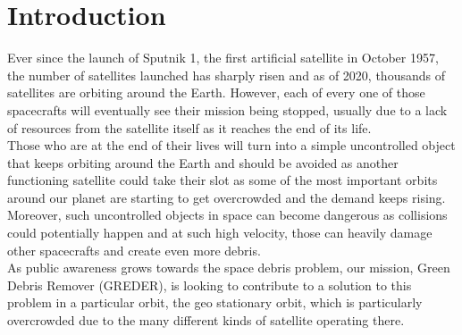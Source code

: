 \chapter*{Introduction}
\qquad Ever since the launch of Sputnik 1, the first artificial satellite in October 1957, the number of satellites launched has sharply risen and as of 2020, thousands of satellites are orbiting around the Earth. However, each of every one of those spacecrafts will eventually see their mission being stopped, usually due to a lack of resources from the satellite itself as it reaches the end of its life. \\

Those who are at the end of their lives will turn into a simple uncontrolled object that keeps orbiting around the Earth and should be avoided as another functioning satellite could take their slot as some of the most important orbits around our planet are starting to get overcrowded and the demand keeps rising.\\

Moreover, such uncontrolled objects in space can become dangerous as collisions could potentially happen and at such high velocity, those can heavily damage other spacecrafts and create even more debris.\\

As public awareness grows towards the space debris problem, our mission, Green Debris Remover (GREDER), is looking to contribute to a solution to this problem in a particular orbit, the geo stationary orbit, which is particularly overcrowded due to the many different kinds of satellite operating there.